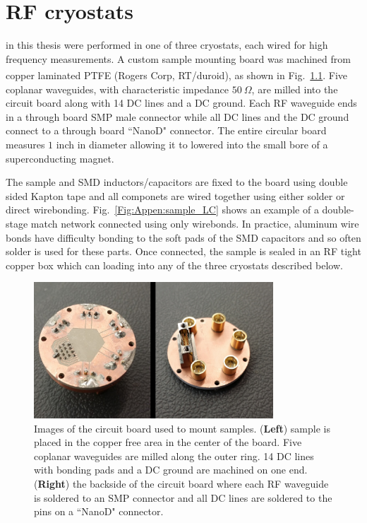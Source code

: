 \chapter{RF cryostats}
\label{appen:RF_cryostats}
 in this thesis were performed in one of three cryostats, each wired for high frequency measurements. A custom sample mounting board was machined from copper laminated PTFE (Rogers Corp, RT/duroid\textsuperscript{\textregistered}), as shown in Fig.~\ref{Fig:Appen:sample_board}. Five coplanar waveguides, with characteristic impedance $50~\Omega$, are milled into the circuit board along with 14 DC lines and a DC ground. Each RF waveguide ends in a through board SMP male connector while all DC lines and the DC ground connect to a through board ``NanoD" connector. The entire circular board measures $1$ inch in diameter allowing it to lowered into the small bore of a superconducting magnet. 

The sample and SMD inductors/capacitors are fixed to the board using double sided Kapton tape and all componets are wired together using either solder or direct wirebonding. Fig.~\ref{Fig:Appen:sample_LC} shows an example of a double-stage match network connected using only wirebonds. In practice, aluminum wire bonds have difficulty bonding to the soft pads of the SMD capacitors and so often solder is used for these parts. Once connected, the sample is sealed in an RF tight copper box which can loading into any of the three cryostats described below.

\begin{figure}
\centering
\includegraphics[width=0.8\textwidth]{figures/appendix/cryostats/sample_package.jpg}
\caption{Images of the circuit board used to mount samples. (\textbf{Left}) sample is placed in the copper free area in the center of the board. Five coplanar waveguides are milled along the outer ring. 14 DC lines with bonding pads and a DC ground are machined on one end. (\textbf{Right}) the backside of the circuit board where each RF waveguide is soldered to an SMP connector and all DC lines are soldered to the pins on a ``NanoD" connector.}
\label{Fig:Appen:sample_board}
\end{figure}

